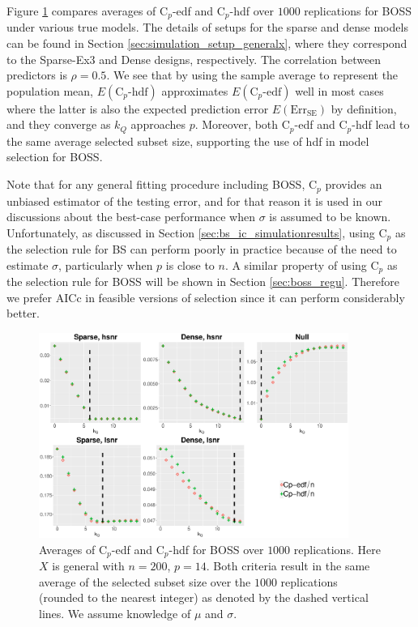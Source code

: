 Figure \ref{fig:boss_cp_edf_hdf} compares averages of C$_p$-edf and C$_p$-hdf over $1000$ replications for BOSS under various true models. The details of setups for the sparse and dense models can be found in Section \ref{sec:simulation_setup_generalx}, where they correspond to the Sparse-Ex3 and Dense designs, respectively. The correlation between predictors is $\rho=0.5$. We see that by using the sample average to represent the population mean, $E(\text{C}_p\text{-hdf})$ approximates $E(\text{C}_p\text{-edf})$ well in most cases where the latter is also the expected prediction error $E(\text{Err}_\text{SE})$ by definition, and they converge as $k_Q$ approaches $p$. Moreover, both C$_p$-edf and C$_p$-hdf lead to the same average selected subset size, supporting the use of hdf in model selection for BOSS. 

Note that for any general fitting procedure including BOSS, C$_p$ provides an unbiased estimator of the testing error, and for that reason it is used in our discussions about the best-case performance when $\sigma$ is assumed to be known. Unfortunately, as discussed in Section \ref{sec:bs_ic_simulationresults}, using C$_p$ as the selection rule for BS can perform poorly in practice because of the need to estimate $\sigma$, particularly when $p$ is close to $n$. A similar property of using C$_p$ as the selection rule for BOSS will be shown in Section \ref{sec:boss_regu}. Therefore we prefer AICc in feasible versions of selection since it can perform considerably better. 

\begin{figure}[ht!]
	\centering
	\includegraphics[width=0.9\textwidth]{figures/cp_edf_hdf_boss.eps}
	\caption{Averages of C$_p$-edf and C$_p$-hdf for BOSS over $1000$ replications. Here $X$ is general with $n=200$, $p=14$. Both criteria result in the same average of the selected subset size over the $1000$ replications (rounded to the nearest integer) as denoted by the dashed vertical lines. We assume knowledge of $\mu$ and $\sigma$.}
	\label{fig:boss_cp_edf_hdf}
\end{figure}

